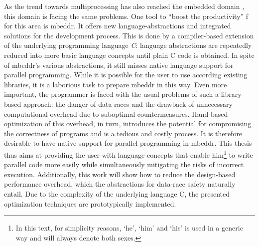 As the trend towards multiprocessing has also reached the embedded domain \cite{MulticoreChallenges}\cite{LeveragingTheBenefits}, this domain is facing the same problems. One tool to ``boost the productivity'' \cite{mbeddr}f for this area is mbeddr. It offers new language-abstractions and integrated solutions for the development process. This is done by a compiler-based extension of the underlying programming language \textit{C}: language abstractions are repeatedly reduced into more basic language concepts until plain C code is obtained. In spite of mbeddr's various abstractions, it still misses native language support for parallel programming. While it is possible for the user to use according existing libraries, it is a laborious task to prepare mbeddr in this way. Even more important, the programmer is faced with the usual problems of such a library-based approach: the danger of data-races and the drawback of unnecessary computational overhead due to suboptimal countermeasures. Hand-based optimization of this overhead, in turn, introduces the potential for compromising the correctness of programs and is a tedious and costly process. It is therefore desirable to have native support for parallel programming in mbeddr. This thesis thus aims at providing the user with language concepts that enable him\footnote{In this text, for simplicity reasons, `he', `him' and `his' is used in a generic way and will always denote both sexes.} to write parallel code more easily while simultaneously mitigating the risks of incorrect execution. Additionally, this work will show how to reduce the design-based performance overhead, which the abstractions for data-race safety naturally entail. Due to the complexity of the underlying language C, the presented optimization techniques are prototypically implemented. 

